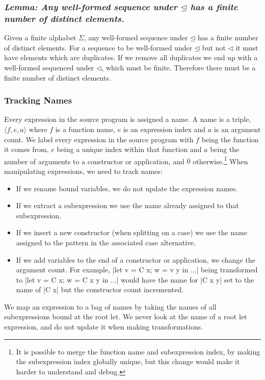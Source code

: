 \documentclass[draft]{sigplanconf}
\newcommand{\name}[3]{\ensuremath{\langle\mathsf{#1},\mathsf{#2},\mathsf{#3}\rangle}}
\newcommand{\lemma}[1]{\subsubsection*{\textit{Lemma: #1}}}
\begin{document}
\lemma{Any well-formed sequence under $\unlhd$ has a finite number of distinct elements.}

Given a finite alphabet $\Sigma$, any well-formed sequence under $\unlhd$ has a finite number of distinct elements. For a sequence to be well-formed under $\unlhd$ but not $\lhd$ it must have elements which are duplicates. If we remove all duplicates we end up with a well-formed sequenced under $\lhd$, which must be finite. Therefore there must be a finite number of distinct elements.

\subsubsection{Tracking Names}

Every expression in the source program is assigned a name. A name is a triple, \name{\mathit{f}}{\mathit{e}}{\mathit{a}} where $f$ is a function name, $e$ is an expression index and $a$ is an argument count. We label every expression in the source program with $f$ being the function it comes from, $e$ being a unique index within that function and $a$ being the number of arguments to a constructor or application, and $0$ otherwise.\footnote{It is possible to merge the function name and subexpression index, by making the subexpression index globally unique, but this change would make it harder to understand and debug.} When manipulating expressions, we need to track names:

\begin{itemize}
\item If we rename bound variables, we do not update the expression names.
\item If we extract a subexpression we use the name already assigned to that subexpression.
\item If we insert a new constructor (when splitting on a case) we use the name assigned to the pattern in the associated case alternative.
\item If we add variables to the end of a constructor or application, we change the argument count. For example, |let v = C x; w = v y in ...| being transformed to |let v = C x; w = C x y in ...| would have the name for |C x y| set to the name of |C x| but the constructor count incremented.
\end{itemize}

We map an expression to a bag of names by taking the names of all subexpressions bound at the root let. We never look at the name of a root let expression, and do not update it when making transformations.
\end{document}
